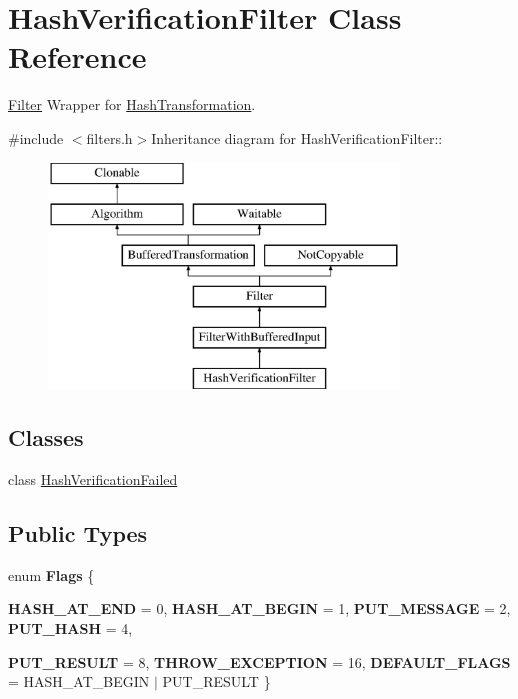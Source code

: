 \hypertarget{class_hash_verification_filter}{
\section{HashVerificationFilter Class Reference}
\label{class_hash_verification_filter}
}


\hyperlink{class_filter}{Filter} Wrapper for \hyperlink{class_hash_transformation}{HashTransformation}.  


{\ttfamily \#include $<$filters.h$>$}Inheritance diagram for HashVerificationFilter::\begin{figure}[H]
\begin{center}
\leavevmode
\includegraphics[height=6cm]{class_hash_verification_filter}
\end{center}
\end{figure}
\subsection*{Classes}
\begin{DoxyCompactItemize}
\item 
class \hyperlink{class_hash_verification_filter_1_1_hash_verification_failed}{HashVerificationFailed}
\end{DoxyCompactItemize}
\subsection*{Public Types}
\begin{DoxyCompactItemize}
\item 
enum {\bfseries Flags} \{ \par
{\bfseries HASH\_\-AT\_\-END} = 0, 
{\bfseries HASH\_\-AT\_\-BEGIN} = 1, 
{\bfseries PUT\_\-MESSAGE} = 2, 
{\bfseries PUT\_\-HASH} = 4, 
\par
{\bfseries PUT\_\-RESULT} = 8, 
{\bfseries THROW\_\-EXCEPTION} = 16, 
{\bfseries DEFAULT\_\-FLAGS} =  HASH\_\-AT\_\-BEGIN $|$ PUT\_\-RESULT
 \}
\end{DoxyCompactItemize}

